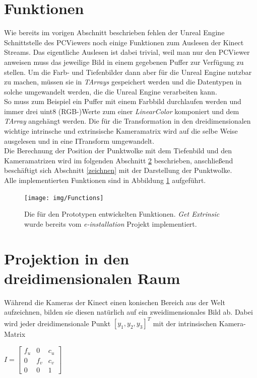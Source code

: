 \documentclass[a4paper]{IEEEtran}
\begin{document}
\section{Funktionen}
	Wie bereits im vorigen Abschnitt beschrieben fehlen der Unreal Engine Schnittstelle des PCViewers noch einige Funktionen zum Auslesen der Kinect Streams. 
	Das eigentliche Auslesen ist dabei trivial, weil man nur den PCViewer anweisen muss das jeweilige Bild in einem gegebenen Puffer zur Verfügung zu stellen. 
	Um die Farb- und Tiefenbilder dann aber für die Unreal Engine nutzbar zu machen, müssen sie in {\textit{TArrays}} gespeichert werden und die Datentypen in solche umgewandelt werden, die die Unreal Engine verarbeiten kann. \\
	So muss zum Beispiel ein Puffer mit einem Farbbild durchlaufen werden und immer drei uint8 (RGB-)Werte zum einer {\textit{LinearColor}} komponiert und dem {\textit{TArray}} angehängt werden.
	Die für die Transformation in den dreidimensionalen wichtige intrinsche und extrinsische Kameramatrix wird auf die selbe Weise ausgelesen und in eine ITransform umgewandelt. \\
	Die Berechnung der Position der Punktwolke mit dem Tiefenbild und den Kameramatrizen wird im folgenden Abschnitt {\ref{projektion}} beschrieben, anschließend beschäftigt sich Abschnitt {\ref{zeichnen}} mit der Darstellung der Punktwolke. \\
	Alle implementierten Funktionen sind in Abbildung \ref{AllFunctionsBP} aufgeführt.\\[0.5cm]
	
	\begin{figure}[!h]
    	\centering
		\texttt{[image: img/Functions]}
	    \caption{Die für den Prototypen entwickelten Funktionen. {\textit{Get Extrinsic}} wurde bereits vom {\textit{e-installation}} Projekt implementiert.}
    	\label{AllFunctionsBP}
	\end{figure}


\section{Projektion in den dreidimensionalen Raum}
\label{projektion}
	Während die Kameras der Kinect einen konischen Bereich aus der Welt aufzeichnen, bilden sie diesen natürlich auf ein zweidimensionales Bild ab. 
	Dabei wird jeder dreidimensionale Punkt $[y_1,y_2,y_3]^T$ mit der intrinsischen Kamera-Matrix \\ [1cm]

\begin{center}
$I = \begin{bmatrix}
f_u & 0 & c_u  \\
0 & f_v & c_v  \\
0 & 0 & 1  
\end{bmatrix}$\\[1cm]
\end{center}
\end{document}
